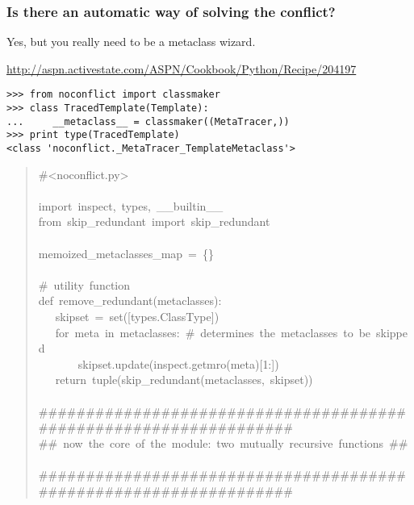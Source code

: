 \documentclass[10pt,a4paper,english]{article}
\begin{document}
\subsubsection*{Is there an automatic way of solving the conflict?}

Yes, but you really need to be a metaclass wizard.

\href{http://aspn.activestate.com/ASPN/Cookbook/Python/Recipe/204197}{http://aspn.activestate.com/ASPN/Cookbook/Python/Recipe/204197}
\begin{verbatim}>>> from noconflict import classmaker
>>> class TracedTemplate(Template):
...     __metaclass__ = classmaker((MetaTracer,))
>>> print type(TracedTemplate)
<class 'noconflict._MetaTracer_TemplateMetaclass'>\end{verbatim}
\begin{quote}{\ttfamily \raggedright \noindent
{\#}<noconflict.py>~\\
~\\
import~inspect,~types,~{\_}{\_}builtin{\_}{\_}~\\
from~skip{\_}redundant~import~skip{\_}redundant~\\
~\\
memoized{\_}metaclasses{\_}map~=~{\{}{\}}~\\
~\\
{\#}~utility~function~\\
def~remove{\_}redundant(metaclasses):~\\
~~~skipset~=~set({[}types.ClassType])~\\
~~~for~meta~in~metaclasses:~{\#}~determines~the~metaclasses~to~be~skipped~\\
~~~~~~~skipset.update(inspect.getmro(meta){[}1:])~\\
~~~return~tuple(skip{\_}redundant(metaclasses,~skipset))~\\
~\\
{\#}{\#}{\#}{\#}{\#}{\#}{\#}{\#}{\#}{\#}{\#}{\#}{\#}{\#}{\#}{\#}{\#}{\#}{\#}{\#}{\#}{\#}{\#}{\#}{\#}{\#}{\#}{\#}{\#}{\#}{\#}{\#}{\#}{\#}{\#}{\#}{\#}{\#}{\#}{\#}{\#}{\#}{\#}{\#}{\#}{\#}{\#}{\#}{\#}{\#}{\#}{\#}{\#}{\#}{\#}{\#}{\#}{\#}{\#}{\#}{\#}{\#}{\#}{\#}{\#}{\#}~\\
{\#}{\#}~now~the~core~of~the~module:~two~mutually~recursive~functions~{\#}{\#}~\\
{\#}{\#}{\#}{\#}{\#}{\#}{\#}{\#}{\#}{\#}{\#}{\#}{\#}{\#}{\#}{\#}{\#}{\#}{\#}{\#}{\#}{\#}{\#}{\#}{\#}{\#}{\#}{\#}{\#}{\#}{\#}{\#}{\#}{\#}{\#}{\#}{\#}{\#}{\#}{\#}{\#}{\#}{\#}{\#}{\#}{\#}{\#}{\#}{\#}{\#}{\#}{\#}{\#}{\#}{\#}{\#}{\#}{\#}{\#}{\#}{\#}{\#}{\#}{\#}{\#}{\#}~\\
}
\end{quote}
\end{document}
